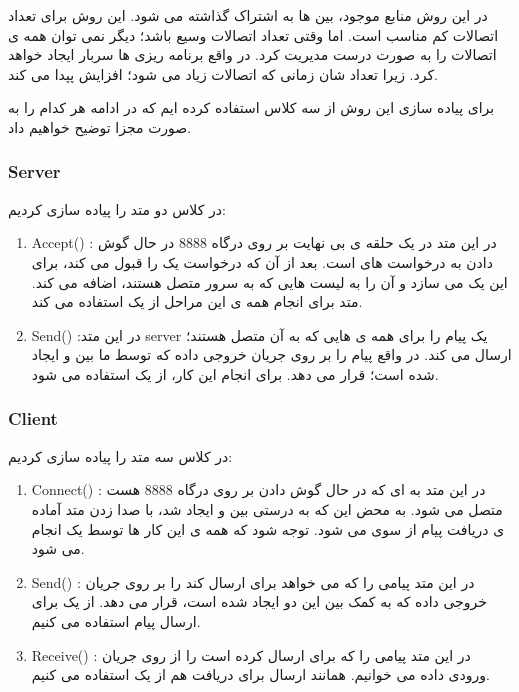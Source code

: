 در این روش منابع موجود، بین 
ها به اشتراک گذاشته می شود. این روش برای تعداد اتصالات کم مناسب است. اما وقتی تعداد اتصالات وسیع باشد؛ دیگر نمی توان همه ی اتصالات را به صورت درست مدیریت کرد. در واقع برنامه ریزی 
ها سربار ایجاد خواهد کرد. زیرا تعداد شان زمانی که اتصالات زیاد می شود؛ افزایش پپدا می کند.

برای پیاده سازی این روش از سه کلاس استفاده کرده ایم که در ادامه هر کدام را به صورت مجزا توضیح خواهیم داد.
\subsubsection{Server}
در کلاس 
دو متد را پیاده سازی کردیم:
\begin{enumerate}
	\item Accept()
: در این متد 
در یک حلقه ی بی نهایت بر روی درگاه 8888 در حال گوش دادن به درخواست های 
است. بعد از آن که
درخواست یک 
را قبول می کند، برای این 
یک 
می سازد و آن را به لیست 
هایی که به سرور متصل هستند، اضافه می کند. متد 
برای انجام همه ی این مراحل از یک 
استفاده می کند.
	\item Send()
	:در این متد server یک پیام را برای همه ی 
	هایی که به آن متصل هستند؛ ارسال می کند. در واقع پیام را بر روی جریان خروجی داده که توسط 
	ما بین 
	و 
	ایجاد شده است؛ قرار می دهد. برای انجام این کار، از یک 
	استفاده می شود.
\end{enumerate}

\subsubsection{Client}
در کلاس 
سه متد را پیاده سازی کردیم:
\begin{enumerate}
	\item Connect()
	: در این متد 
	 به 
	 ای که در حال گوش دادن بر روی درگاه 8888 هست متصل می شود. به محض این که 
	به درستی بین 
	و
	ایجاد شد، 
	با صدا زدن متد
	آماده ی دریافت پیام از سوی 
	می شود. توجه شود که همه ی این کار ها توسط یک 
	انجام می شود.
	\item Send()
	: در این متد 
	پیامی را که می خواهد برای 
	ارسال کند را بر روی جریان خروجی داده که به کمک 
	بین این دو ایجاد شده است، قرار می دهد. از یک 
	برای ارسال پیام استفاده می کنیم.
	\item Receive()
	: در این متد پیامی را که 
	برای
	ارسال کرده است را از روی جریان ورودی داده می خوانیم. همانند ارسال برای دریافت هم از یک 
	استفاده می کنیم.
\end{enumerate}


